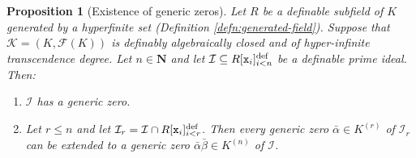 \documentclass{amsart}
\newcommand{\ca}{\mathcal}
\newcommand{\ideal}[1]{\ca #1}
\theoremstyle{plain}
\newtheorem{prop}[thm]{Proposition}
\theoremstyle{definition}
\newcommand{\F}{\mathcal{F}}
\newcommand{\hn}{\mathbf N}
\newcommand{\polyn}[2]{{#1}[{\tt x}_i]_{i<#2}^\text{def}}
\begin{document}
\begin{prop}[Existence of generic zeros] \label{prop:generic} Let $R$ be a definable subfield of $K$ generated by a hyperfinite set (Definition \ref{defn:generated-field}). Suppose that $\ca K = (K, \F(K))$ is definably algebraically closed and of hyper-infinite transcendence degree. 
Let $n\in \hn$ and let $\ideal I \subseteq \polyn R n$ be a definable prime ideal. Then:  
\begin{enumerate}
\item 
$\ideal I$ has a generic zero. 
\item Let $r\leq n$ and let ${\ideal I}_r = \ideal I \cap \polyn R r$. Then every generic zero $\bar \alpha \in K^{(r)}$ of ${\ideal I}_r$ can be extended to a generic zero $\bar \alpha \bar \beta \in K^{(n)}$ of $\ideal I$. 
\end{enumerate}
\end{prop}
\end{document}
